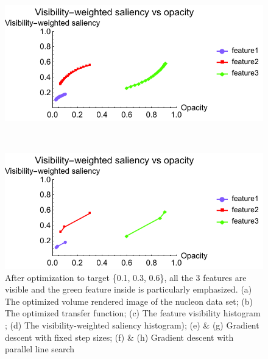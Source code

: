 \begin{figure}
	\begin{minipage}{.49\textwidth}
		\includegraphics[width=1\linewidth]{figures/nucleon_naive_proportional_saliencyopacity_fixed}
		\subcaption{}
	\end{minipage}~
	\begin{minipage}{.49\textwidth}
		\includegraphics[width=1\linewidth]{figures/nucleon_naive_proportional_saliencyopacity_parallelsearch}
		\subcaption{}
	\end{minipage}
	\caption[After optimization to target \{0.1, 0.3, 0.6\}, all the 3 features are visible and the green feature inside is particularly emphasized.]{After optimization to target \{0.1, 0.3, 0.6\}, all the 3 features are visible and the green feature inside is particularly emphasized. (a) The optimized volume rendered image of the nucleon data set; (b) The optimized transfer function; (c) The feature visibility histogram \cite{wang_efficient_2011}; (d) The visibility-weighted saliency histogram); (e) \& (g) Gradient descent with fixed step sizes; (f) \& (h) Gradient descent with parallel line search}
	\label{fig:nucleon_naive_optimized}
\end{figure}

